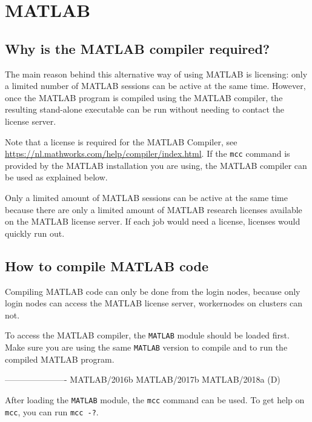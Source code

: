 \chapter{MATLAB}
\label{ch:matlab}

\section{Why is the MATLAB compiler required?}

The main reason behind this alternative way of using MATLAB is licensing: only
a limited number of MATLAB sessions can be active at the same time. However, once
the MATLAB program is compiled using the MATLAB compiler, the resulting stand-alone
executable can be run without needing to contact the license server.

Note that a license is required for the MATLAB Compiler,
see \url{https://nl.mathworks.com/help/compiler/index.html}. If the \lstinline|mcc|
command is provided by the MATLAB installation you are using, the MATLAB compiler
can be used as explained below.

\ifgent
Only a limited amount of MATLAB sessions can be active at the same time because
there are only a limited amount of MATLAB research licenses available on
the \university MATLAB license server. If each job would need a license,
licenses would quickly run out.
\fi

\section{How to compile MATLAB code}

Compiling MATLAB code can only be done from the login nodes, because only login
nodes can access the MATLAB license server, workernodes on clusters can not.

To access the MATLAB compiler, the \lstinline|MATLAB| module should be loaded first. Make sure
you are using the same \lstinline|MATLAB| version to compile and to run the compiled MATLAB
program.

\begin{prompt}
----------------------%
   MATLAB/2016b    MATLAB/2017b    MATLAB/2018a (D)
\end{prompt}

After loading the \lstinline|MATLAB| module, the \lstinline|mcc| command can be used. To get help on
\lstinline|mcc|, you can run \lstinline|mcc -?|.

